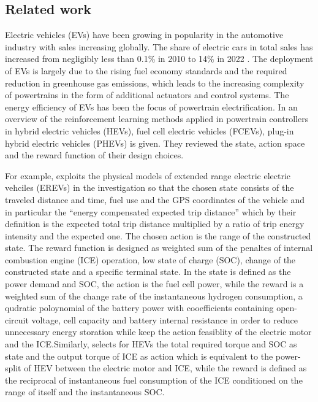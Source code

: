 \documentclass[conference]{IEEEtran}
\begin{document}
\subsection{Related work}\label{sec:related}

Electric vehicles (EVs) have been growing in popularity in the automotive industry with sales increasing globally. The share of electric cars in total sales has increased from negligibly less than 0.1\% in 2010 to 14\% in 2022 \parencite{statista_2023}. The deployment of EVs is largely due to the rising fuel economy standards and the required reduction in greenhouse gas emissions, which leads to the increasing complexity of powertrains in the form of additional actuators and control systems. The energy efficiency of EVs has been the focus of powertrain electrification. In \parencite{Egan_2023} an overview of the reinforcement learning methods applied in powertrain controllers in hybrid electric vehicles (HEVs), fuel cell electric vehicles (FCEVs), plug-in hybrid electric vehicles (PHEVs) is given. They reviewed the state, action space and the reward function of their design choices.

For example, \parencite{Wang_2020} exploits the physical models of extended range electric electric vehciles (EREVs) in the investigation so that the chosen state consists of the traveled distance and time, fuel use and the GPS coordinates of the vehicle and in particular the ``energy compensated expected trip distance'' which by their definition is the expected total trip distance multiplied by a ratio of trip energy intensity and the expected one. The chosen action is the range of the constructed state. The reward function is designed as weighted sum of the penaltes of internal combustion engine (ICE) operation, low state of charge (SOC), change of the constructed state and a specific terminal state. In \parencite{Hou_2022} the state is defined as the power demand and SOC, the action is the fuel cell power, while the reward is a weighted sum of the change rate of the instantaneous hydrogen consumption, a qudratic poloynomial of the battery power with cooefficients containing open-circuit voltage, cell capacity and battery internal resistance in order to reduce unnecessary energy storation while keep the action feasiblity of the electric motor and the ICE.\@ Similarly, \parencite{Hu_2018} selects for HEVs the total required torque and SOC as state and the output torque of ICE as action which is equivalent to the power-split of HEV between the electric motor and ICE, while the reward is defined as the reciprocal of instantaneous fuel consumption of the ICE conditioned on the range of itself and the instantaneous SOC\@.
\end{document}
